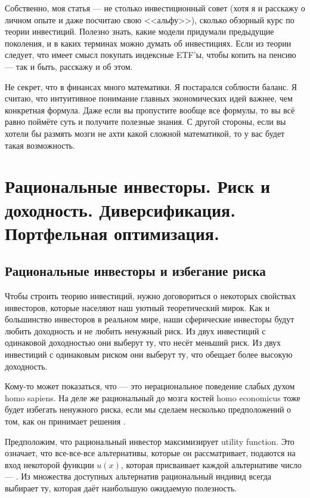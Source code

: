 Собственно, моя статья --- не столько инвестиционный совет (хотя я и расскажу о
личном опыте и даже посчитаю свою <<альфу>>), сколько обзорный курс по теории 
инвестиций. Полезно знать, какие модели придумали предыдущие поколения, и в 
каких терминах можно думать об инвестициях. Если из теории следует, что имеет 
смысл покупать индексные ETF'ы, чтобы копить на пенсию --- так и быть, расскажу 
и об этом.

Не секрет, что в финансах много математики. Я постарался соблюсти баланс. Я 
считаю, что интуитивное понимание главных экономических идей важнее, чем 
конкретная формула. Даже если вы пропустите вообще все формулы, то вы всё равно 
поймёте суть и получите полезные знания. С другой стороны, если вы хотели бы 
размять мозги не ахти какой сложной математикой, то у вас будет такая 
возможность.

\clearpage
\section{Рациональные инвесторы. Риск и доходность. Диверсификация. Портфельная
оптимизация.}

\subsection{Рациональные инвесторы и избегание риска}

Чтобы строить теорию инвестиций, нужно договориться о некоторых свойствах 
инвесторов, которые населяют наш уютный теоретический мирок. Как и большинство 
инвесторов в реальном мире, наши сферические инвесторы будут любить доходность и 
не любить ненужный риск. Из двух инвестиций с одинаковой доходностью они выберут 
ту, что несёт меньший риск. Из двух инвестиций с одинаковым риском они выберут 
ту, что обещает более высокую доходность.

Кому-то может показаться, что  --- это
нерациональное поведение слабых духом homo sapiens. На деле же рациональный до
мозга костей homo economicus тоже будет избегать ненужного риска, если мы
сделаем несколько предположений о том, как он принимает решения
\cite[ch.~6.1]{bodie2014investments}.
 
Предположим, что рациональный инвестор максимизирует 
{utility function}. Это означает, что все-все-все альтернативы, которые он 
рассматривает, подаются на вход некоторой функции $u(x)$, которая присваивает
каждой альтернативе число --- . Из множества доступных 
альтернатив рациональный индивид всегда выбирает ту, которая даёт наибольшую
ожидаемую полезность.
 

